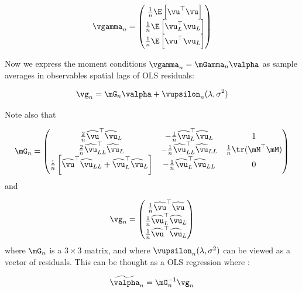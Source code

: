 \documentclass[english,12pt]{book}\usepackage[]{graphicx}\usepackage[]{xcolor}
\begin{document}
\begin{equation}
  \vgamma_n = \begin{pmatrix}
  \frac{1}{n}\E\left[\vu^\top\vu\right] \\
  \frac{1}{n}\E\left[\vu^\top_L\vu_L\right] \\
  \frac{1}{n}\E\left[\vu^\top\vu_L\right]
        \end{pmatrix}
\end{equation}

Now we express the moment conditions $\vgamma_n = \mGamma_n\valpha$ as sample averages in observables spatial lags of OLS residuals:

\begin{equation}\label{eq:sample_moments_sem}
  \vg_n = \mG_n\valpha +  \vupsilon_n(\lambda, \sigma^2) 
\end{equation}


Note also that


\begin{equation*}
  \mG_n = \begin{pmatrix}
   \frac{2}{n}\widehat{\vu}^\top\widehat{\vu}_L & -\frac{1}{n}\widehat{\vu}_L^\top\widehat{\vu}_L & 1\\
   \frac{2}{n}\widehat{\vu}^\top_{LL}\widehat{\vu}_L & -\frac{1}{n}\widehat{\vu}_{LL}^\top\widehat{\vu}_{LL} & \frac{1}{n} \tr(\mM^\top\mM)\\
   \frac{1}{n}\left[\widehat{\vu}^\top\widehat{\vu}_{LL} + \widehat{\vu}_L^\top\widehat{\vu}_L\right] & -\frac{1}{n}\widehat{\vu}_{L}^\top\widehat{\vu}_{LL} & 0
        \end{pmatrix}
\end{equation*}
%
and

\begin{equation*}
  \vg_n = \begin{pmatrix}
  \frac{1}{n}\widehat{\vu}^\top\widehat{\vu} \\
  \frac{1}{n}\widehat{\vu}^\top_L\widehat{\vu}_L \\
  \frac{1}{n}\widehat{\vu}^\top\widehat{\vu}_L
        \end{pmatrix}
\end{equation*}
%
where $\mG_n$ is a $3\times 3$ matrix, and where $\vupsilon_n(\lambda, \sigma^2)$ can be viewed as a vector of residuals. This can be thought as a OLS regression where \citep{kelejian1998generalized}:

\begin{equation}\label{eq:moments_as_ols}
\widetilde{\valpha}_n = \mG_n^{-1}\vg_n
\end{equation}
\end{document}
